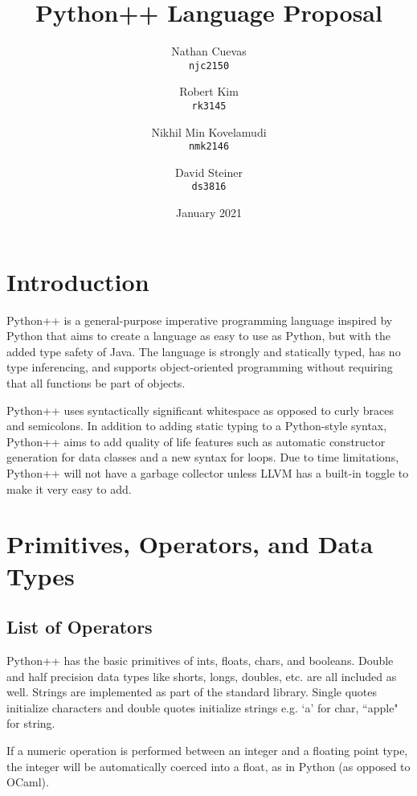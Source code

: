 \documentclass{article}
\title{Python++ Language Proposal}
\author{
Nathan Cuevas\\
\texttt{njc2150} 
\and
Robert Kim\\
\texttt{rk3145} \and
Nikhil Min Kovelamudi \\
\texttt{nmk2146} \and
David Steiner \\
\texttt{ds3816}
}
\date{January 2021}
\begin{document}
\maketitle

\section{Introduction}
Python++ is a general-purpose imperative programming language inspired by Python that aims to create a language as easy to use as Python, but with the added type safety of Java. The language is strongly and statically typed, has no type inferencing, and supports object-oriented programming without requiring that all functions be part of objects.

Python++ uses syntactically significant whitespace as opposed to curly braces and semicolons. In addition to adding static typing to a Python-style syntax, Python++ aims to add quality of life features such as automatic constructor generation for data classes and a new syntax for loops. Due to time limitations, Python++ will not have a garbage collector unless LLVM has a built-in toggle to make it very easy to add.

\section{Primitives, Operators, and Data Types}
\subsection{List of Operators}
Python++ has the basic primitives of ints, floats, chars, and booleans.  Double and half precision data types like shorts, longs, doubles, etc. are all included as well.  Strings are implemented as part of the standard library.  Single quotes initialize characters and double quotes initialize strings e.g. `a' for char, ``apple" for string.  

If a numeric operation is performed between an integer and a floating point type, the integer will be automatically coerced into a float, as in Python (as opposed to OCaml).
\end{document}
